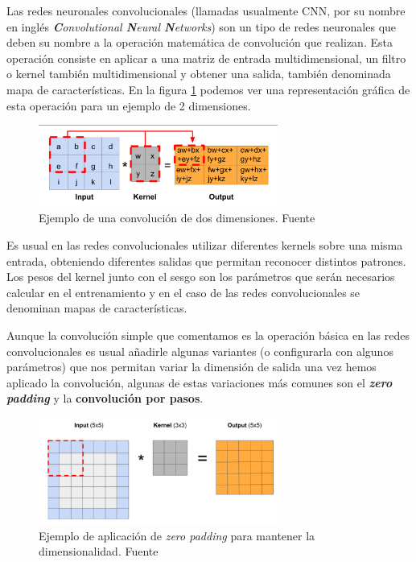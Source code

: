 Las redes neuronales convolucionales (llamadas usualmente CNN, por su nombre en inglés \textit{\textbf{C}onvolutional \textbf{N}eural \textbf{N}etworks}) son un tipo de redes neuronales que deben su nombre a la operación matemática de convolución que realizan. Esta operación consiste en aplicar a una matriz de entrada multidimensional, un filtro o kernel también multidimensional y obtener una salida, también denominada mapa de características. En la figura \ref{fig:cnn1} podemos ver una representación gráfica de esta operación para un ejemplo de 2 dimensiones. 

\begin{figure}[!ht]
	\centering
	\includegraphics[width=0.7\textwidth]{images/arte/cnn1}
	\caption{Ejemplo de una convolución de dos dimensiones. Fuente \cite{temariodeeplearning}}
	\label{fig:cnn1}
\end{figure}

Es usual en las redes convolucionales  utilizar diferentes kernels sobre una misma entrada, obteniendo diferentes salidas que permitan reconocer distintos patrones. Los pesos del kernel junto con el sesgo son los parámetros que serán necesarios calcular en el entrenamiento y en el caso de las redes convolucionales se denominan mapas de características.

Aunque la convolución simple que comentamos es la operación básica en las redes convolucionales es usual añadirle algunas variantes (o configurarla con algunos parámetros) que nos permitan variar la dimensión de salida una vez hemos aplicado la convolución, algunas de estas variaciones más comunes son el \textbf{\textit{zero padding}} y la \textbf{convolución por pasos}.

\begin{figure}[!ht]
	\centering
	\includegraphics[width=0.7\textwidth]{images/arte/padding}
	\caption{Ejemplo de aplicación de \textit{zero padding} para mantener la dimensionalidad. Fuente \cite{temariodeeplearning}}
	\label{fig:padding}
\end{figure}

